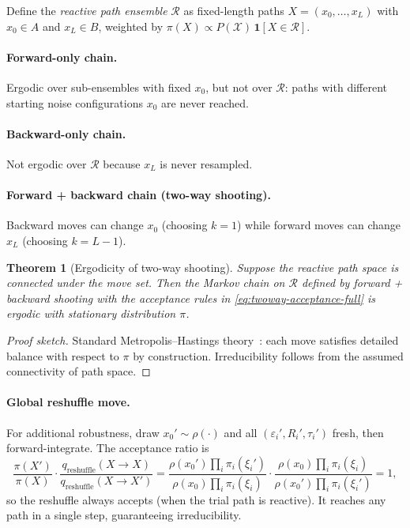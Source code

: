 \documentclass[11pt,a4paper]{article}
\newtheorem{theorem}{Theorem}[section]
\begin{document}
Define the \emph{reactive path ensemble} $\mathcal{R}$ as fixed-length
paths $X = (x_0,\ldots,x_L)$ with $x_0 \in A$ and $x_L \in B$,
weighted by $\pi(X) \propto P(\mathcal{X})\,\mathbf{1}[X \in \mathcal{R}]$.

\paragraph{Forward-only chain.}
Ergodic over sub-ensembles with fixed $x_0$, but not over $\mathcal{R}$:
paths with different starting noise configurations $x_0$ are never reached.

\paragraph{Backward-only chain.}
Not ergodic over $\mathcal{R}$ because $x_L$ is never resampled.

\paragraph{Forward + backward chain (two-way shooting).}
Backward moves can change $x_0$ (choosing $k=1$) while forward moves
can change $x_L$ (choosing $k=L-1$).

\begin{theorem}[Ergodicity of two-way shooting]
\label{thm:ergodicity}
Suppose the reactive path space is connected under the move set.
Then the Markov chain on $\mathcal{R}$ defined by forward + backward
shooting with the acceptance rules in \cref{eq:twoway-acceptance-full}
is ergodic with stationary distribution $\pi$.
\end{theorem}

\begin{proof}[Proof sketch]
Standard Metropolis--Hastings theory~\cite{bolhuis2002}: each move
satisfies detailed balance with respect to $\pi$ by construction.
Irreducibility follows from the assumed connectivity of path space.
\end{proof}

\paragraph{Global reshuffle move.}
For additional robustness, draw $x_0' \sim \rho(\cdot)$ and all
$(\varepsilon_i', R_i', \tau_i')$ fresh, then forward-integrate.
The acceptance ratio is
\begin{equation}
  \frac{\pi(X')}{\pi(X)} \cdot
  \frac{q_{\mathrm{reshuffle}}(X \to X)}{q_{\mathrm{reshuffle}}(X \to X')}
  = \frac{\rho(x_0') \prod_i \pi_i(\xi_i')}
         {\rho(x_0) \prod_i \pi_i(\xi_i)}
    \cdot \frac{\rho(x_0) \prod_i \pi_i(\xi_i)}
               {\rho(x_0') \prod_i \pi_i(\xi_i')}
  = 1,
\end{equation}
so the reshuffle always accepts (when the trial path is reactive).
It reaches any path in a single step, guaranteeing irreducibility.
\end{document}
